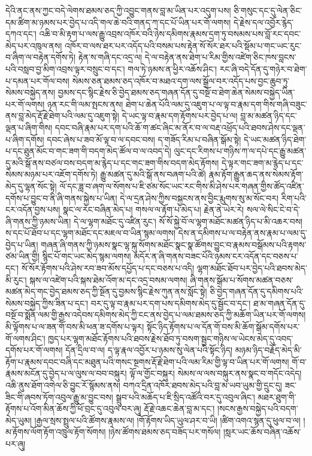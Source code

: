 \documentclass{article}
\begin{document}
དེའི་ནང་ནས་ཀྱང་བདེ་ལེགས་ཐམས་ཅད་ཀྱི་འབྱུང་གནས་བླ་མ་ཡིན་པར་འདུག་པས། ཅི་གསུང་དང་དུ་ལེན་ཅིང་དམ་ཚིག་མ་ཉམས་པར་བྱེད་པ་འདི་གལ་ཆེ་བའི་གནད་ཀ་དང་པོ་ཡིན་པར་གོ་ལགས། དེ་རྗེས་དལ་འབྱོར་རྙེད་དཀའ་དང་། འཆི་བ་མི་རྟག་པ་ལས་རྒྱུ་འབྲས་འཁོར་བའི་ཉེས་དམིགས་རྣམས་དྲག་ཏུ་བསམས་པས་བློ་རང་དབང་མེད་པར་འཁུལ་ནས། འཁོར་བ་ལས་ཐར་པར་འདོད་པའི་བསམ་པས་རྟེན་སོ་སོར་ཐར་པའི་སྡོམ་པ་གང་ཡང་རུང་བ་ཞིག་ལ་བརྟེན་དགོས་ཏེ། རྟེན་ས་གཞི་དང་འདྲ་ལ། དེ་ལ་བརྟེན་ནས་ཐེག་པ་རིམ་གྱིས་འཛེག་ཅིང་ཁས་བླངས་པའི་བསླབ་བྱ་མིག་འབྲས་ལྟར་བསྲུང་བ་དང་། གལ་ཏེ་ཉམས་ན་ཕྱིར་འཆོས་ཤིང་། རང་ཞི་བདེ་དོན་དུ་གཉེར་བ་ཐེག་པ་དམན་པར་གོལ་བས། སེམས་ཅན་ཐམས་ཅད་འཁོར་བ་མཐའ་དག་ལས་སྒྲོལ་བར་འདོད་པས་བྱང་ཆུབ་ཏུ་སེམས་བསྐྱེད་ནས། བྱམས་དང་སྙིང་རྗེས་ཅི་བྱེད་ཐམས་ཅད་གཞན་དོན་དུ་བསྔོ་བ་ཐེག་ཆེན་སེམས་བསྐྱེད་ཡིན་པར་གོ་ལགས། ཉན་རང་གི་ལམ་སྤངས་ནས། ཐེག་པ་ཆེན་པོའི་ལམ་དུ་འཇུག་པ་ལ་ལྟ་བ་རྣམ་དག་གིས་གཞི་བཟུང་ནས་བླ་མེད་རྡོ་རྗེ་ཐེག་པའི་ལམ་དུ་འཇུག་སྟེ། དེ་ཡང་ལྟ་བ་རྣམ་དག་རྟོགས་པར་བྱེད་པ་ལ། བླ་མ་མཚན་ཉིད་དང་ལྡན་པ་ཞིག་གིས། དབང་བཞི་རྣམ་པར་དག་པའི་ཆོ་ག་ཚང་ཞིང་མ་ནོར་བ་ལ་བརྡ་འཕྲོད་པའི་ཐབས་ཤེས་དང་ལྡན་པ་ཞིག་དགོས། དབང་ཞེས་པ་ཟབ་མོ་ལྟ་བ་ལ་དབང་བས། ད་གཟོད་རིམ་པ་བཞིན་སྒོམ་སྟེ། དེ་ཡང་མཚན་ཉིད་ཐེག་པ་དང་ཐུན་མོང་བ་གང་ཟག་གི་བདག་མེད་ཚོལ་བ་ལ་འབད་དེ། ལུང་དང་རིགས་པ་གཉིས་ཀ་ལ་དཔེ་དང་རྒྱུ་མཚན་དུ་མའི་སྒོ་ནས་བཙལ་བས་བདག་མ་རྙེད་པ་དང་གང་ཟག་གིས་བདག་མེད་རྟོགས། དེ་ལྟར་གང་ཟག་མ་རྙེད་པ་དང་སེམས་མཉམ་པར་འཇོག་དགོས་ཏེ། རྒྱུ་མཚན་དུ་མའི་སྒོ་ནས་བཞག་པའི་ཚེ། རྣམ་རྟོག་རྒྱུན་ཆད་ནས་སེམས་རྟོག་མེད་དུ་ལྷན་སོང་སྟེ། ལོ་དང་ཟླ་བ་ཞག་ལ་སོགས་པ་ཇི་ཙམ་སོང་ཡང་རང་གིས་མི་ཤེས་པར་གཞན་གྱིས་ཚོད་འཛིན་དགོས་པ་བྱུང་བ་ནི་ཞི་གནས་སྐྱེས་པ་ཡིན། དེ་ལ་དྲན་ཤེས་ཀྱིས་བསྐྱངས་ནས་བྱིང་རྨུགས་སུ་མ་སོང་བར། རིག་པའི་ངར་འདོན་བྱས་པས། སྣང་ལ་རང་བཞིན་མེད་པ། གསལ་ལ་རྟོག་པ་མེད་པ། རྗེན་ནེ་ཡེར་རེ། སལ་ལེ་སིང་ངེ་བ་དེ་ཞི་གནས་ཀྱི་ཉམས་ཡིན། དེ་ལ་ལྷག་མཐོང་དུ་འཛིན་རུང་། སོ་སོ་སྐྱེ་བོ་ལ་ལྷག་མཐོང་མཚན་ཉིད་པ་མི་འཆར་བས། ས་དང་པོ་ཐོབ་པ་དང་ལྷག་མཐོང་དང་མཇལ་བ་ཡིན་སྙམ་ལགས། དེས་ན་དམིགས་པ་ལ་བརྟེན་ནས་རྣམ་པ་ལམ་དུ་བྱེད་པ་ཡིན། གཞན་ཞི་གནས་ཀྱི་ཉམས་སྣང་ལྷ་སྐུ་སོགས་མཐོང་སྣང་སྣ་ཚོགས་བྱུང་བ་རྣམས་བསྒོམས་པའི་རྟགས་ཙམ་ཡིན་གྱི། སྙིང་པོ་གང་ཡང་མེད་སྙམ་ལགས། མདོར་ན་ཞི་གནས་བཟང་པོའི་ཉམས་ངར་འདོན་དང་བཅས་པ་དང་། སོ་སོར་རྟོགས་པའི་ཤེས་རབ་ཟབ་མོས་དཔྱོད་པ་དང་བཅས་པ་འདི། ལྷག་མཐོང་ཐོབ་པར་བྱེད་པའི་ཐབས་མེད་མི་རུང་། སྐས་ལ་འཛེག་པའི་སྐས་ཐེམ་འོག་མ་དང་འདྲ་བསམ་ལགས། ཞི་གནས་སྒོམ་པ་སོགས་མཚན་བཅས་མཚན་མེད་གང་བྱེད་ཐམས་ཅད་ཀྱི་སྔོན་དུ་བྱམས་སྙིང་རྗེས་ཀུན་ནས་སློང་སྟེ། ཅི་བྱེད་གཞན་དོན་དུ་དམིགས་པའི་སེམས་བསྐྱེད་ཀྱིས་ཟིན་པ་དང་། བར་དུ་ལྟ་བ་རྣམ་པར་དག་པས་དམིགས་མེད་དུ་སྦྱོང་བ་དང་། ཐ་མ་གཞན་དོན་དུ་བསྔོ་བ་སྨོན་ལམ་གྱི་རྒྱས་འདེབས་དམིགས་མེད་ཀྱི་ངང་ནས་བྱེད་པ་ལམ་ཐམས་ཅད་ཀྱི་མཆོག་ཡིན་པར་གོ་ལགས། མི་ལྟོགས་པ་ལ་ཟན་གོ་བས་མི་ཕན་ཟ་དགོས་པ་ལྟར། སྟོང་ཉིད་རྟོགས་པ་ལ་དོན་གོ་བས་མི་ཆོག་སྒོམ་དགོས་པར་གོ་ལགས་ཤིང་། ཁྱད་པར་ལྷག་མཐོང་རྟོགས་པའི་ཐབས་རྗེས་ཐོབ་ཏུ་བསག་སྦྱང་གཉིས་ལ་ཡེངས་མེད་དུ་འབད་དགོས་པར་གོ་ལགས། དོན་དྲིལ་བ་ལ། ད་ལྟ་རྣལ་འབྱོར་པ་ཉམས་སུ་ལེན་པའི་སྟོང་ཉིད། མཉམ་ཉིད་བརྗོད་མེད་མི་རྟོག་པ་རྣམས་དབང་བཞི་དང་མཐུན་པའི་གསང་སྔགས་རྡོ་རྗེ་ཐེག་པའི་ལམ་རིམ་གྱི་ལྟ་བ་ཡིན་པར་གོ་ལགས། གོ་བ་རྣམས་མངོན་དུ་བྱེད་པ་ལ་ལུས་ལ་བབ་བསྐུར། ལྟོ་ལ་གྱོང་བསྐུར། སེམས་ལ་ལས་བསྐུར་ནས་སྣང་བ་གདོང་འདེད། འཆི་ནུས་ཐོག་འགེལ་ཅི་བྱུང་རོ་སྙོམས་ནས། བཀའ་དྲིན་འཁོར་ཐབས་མེད་པའི་བླ་མ་ཡབ་ཡུམ་གྱི་དྲུང་དུ། ཟང་ཟིང་གི་ཞབས་ཏོག་འབུལ་རྒྱུ་མ་བྱུང་བས། སྒྲུབ་པའི་མཆོད་པ་ཇི་སྲིད་འཚོའི་བར་དུ་འབུལ་ཞིང་། མཐར་ཐུག་གི་རྟོགས་པ་འོག་མིན་ཆོས་ཀྱི་ཕོ་བྲང་དུ་འབུལ་བར་ཞུ། རྡོ་རྗེ་འཆང་ཆེན་བླ་མ་དང་། །སངས་རྒྱས་བསྐྱེད་པའི་བདག་མེད་ཡུམ། །རྒྱལ་སྲས་སྤྲུལ་པའི་ཚོགས་རྣམས་ལ། །གོ་རྟོགས་ཡིད་ཡུལ་ཤར་བ་ཡི། །ཚིག་འགའ་སྙན་དུ་ཕུལ་བ་ལ། །མ་རྟོགས་ལོག་རྟོག་འཁྲུལ་རྟོག་སོགས། །ཉེས་ཚོགས་ཐམས་ཅད་བཟོད་པར་གསོལ། །སླར་ཡང་ཆོས་བཞིན་འཆོས་པར་ཞུ། 
\end{document}
